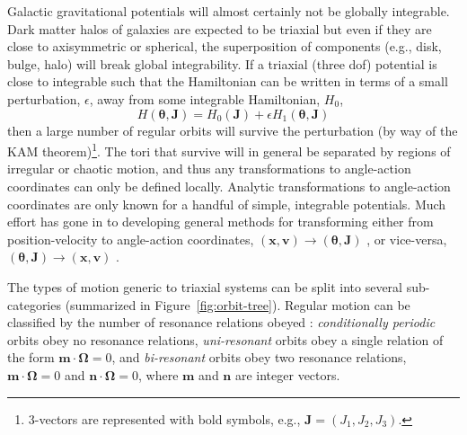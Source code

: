 \documentclass[letterpaper,12pt,preprint]{aastex}
\newcommand{\bs}[1]{\boldsymbol{#1}}
\newcommand{\act}{J}
\begin{document}
Galactic gravitational potentials will almost certainly not be globally integrable. Dark matter halos of galaxies are expected to be triaxial but even if they are close to axisymmetric or spherical, the superposition of components (e.g., disk, bulge, halo) will break global integrability. If a triaxial (three dof) potential is close to integrable such that the Hamiltonian can be written in terms of a small perturbation, $\epsilon$, away from some integrable Hamiltonian, $H_0$,
\begin{equation}
	H(\bs{\theta}, \bs{\act}) = H_0(\bs{\act}) + \epsilon H_1(\bs{\theta}, \bs{\act})
\end{equation}
then a large number of regular orbits will survive the perturbation (by way of the KAM theorem)\footnote{3-vectors are represented with bold symbols, e.g., $\bs{J}=(J_1,J_2,J_3)$.}. The tori that survive will in general be separated by regions of irregular or chaotic motion, and thus any transformations to angle-action coordinates can only be defined locally. Analytic transformations to angle-action coordinates are only known for a handful of simple, integrable potentials. Much effort has gone in to developing general methods for transforming either from position-velocity to angle-action coordinates, $(\bs{x},\bs{v})\rightarrow(\bs{\theta},\bs{J})$ \citep{many}, or vice-versa, $(\bs{\theta},\bs{J})\rightarrow(\bs{x},\bs{v})$ \citep{many}.

The types of motion generic to triaxial systems can be split into several sub-categories (summarized in Figure~\ref{fig:orbit-tree}). Regular motion can be classified by the number of resonance relations obeyed \citep[e.g.,][]{lichtenberg83}: \emph{conditionally periodic} orbits obey no resonance relations, \emph{uni-resonant} orbits obey a single relation of the form $\bs{m}\cdot\bs{\Omega}=0$, and \emph{bi-resonant} orbits obey two resonance relations, $\bs{m}\cdot\bs{\Omega}=0$ and $\bs{n}\cdot\bs{\Omega}=0$, where $\bs{m}$ and $\bs{n}$ are integer vectors.

\end{document}
